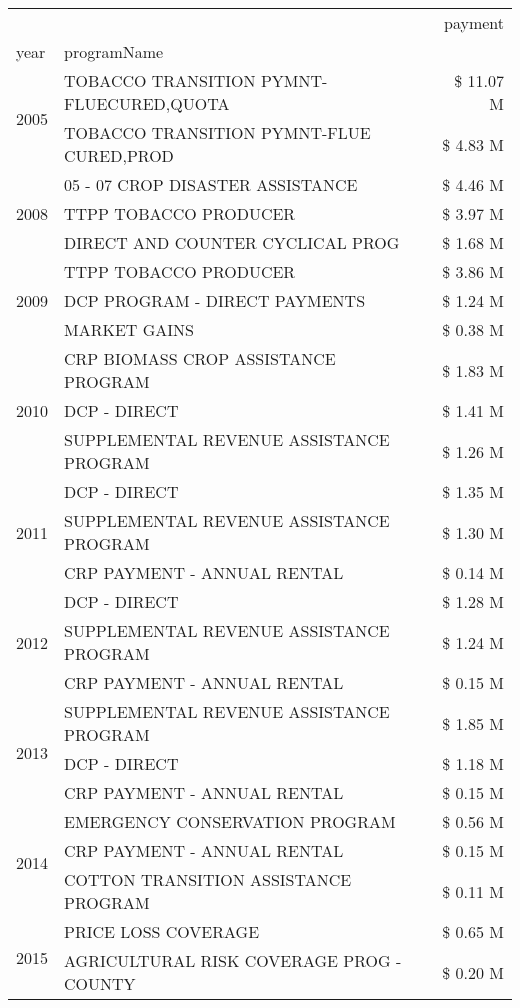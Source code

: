 \begin{tabular}{llr}
\toprule
 &  & payment \\
year & programName &  \\
\midrule
\multirow[t]{2}{*}{2005} & TOBACCO TRANSITION PYMNT-FLUECURED,QUOTA & \$ 11.07 M \\
 & TOBACCO TRANSITION PYMNT-FLUE CURED,PROD & \$ 4.83 M \\
\cline{1-3}
\multirow[t]{3}{*}{2008} & 05 - 07 CROP DISASTER ASSISTANCE & \$ 4.46 M \\
 & TTPP TOBACCO PRODUCER & \$ 3.97 M \\
 & DIRECT AND COUNTER CYCLICAL PROG & \$ 1.68 M \\
\cline{1-3}
\multirow[t]{3}{*}{2009} & TTPP TOBACCO PRODUCER & \$ 3.86 M \\
 & DCP PROGRAM - DIRECT PAYMENTS & \$ 1.24 M \\
 & MARKET GAINS & \$ 0.38 M \\
\cline{1-3}
\multirow[t]{3}{*}{2010} & CRP BIOMASS CROP ASSISTANCE PROGRAM & \$ 1.83 M \\
 & DCP - DIRECT & \$ 1.41 M \\
 & SUPPLEMENTAL REVENUE ASSISTANCE PROGRAM & \$ 1.26 M \\
\cline{1-3}
\multirow[t]{3}{*}{2011} & DCP - DIRECT & \$ 1.35 M \\
 & SUPPLEMENTAL REVENUE ASSISTANCE PROGRAM & \$ 1.30 M \\
 & CRP PAYMENT - ANNUAL RENTAL & \$ 0.14 M \\
\cline{1-3}
\multirow[t]{3}{*}{2012} & DCP - DIRECT & \$ 1.28 M \\
 & SUPPLEMENTAL REVENUE ASSISTANCE PROGRAM & \$ 1.24 M \\
 & CRP PAYMENT - ANNUAL RENTAL & \$ 0.15 M \\
\cline{1-3}
\multirow[t]{3}{*}{2013} & SUPPLEMENTAL REVENUE ASSISTANCE PROGRAM & \$ 1.85 M \\
 & DCP - DIRECT & \$ 1.18 M \\
 & CRP PAYMENT - ANNUAL RENTAL & \$ 0.15 M \\
\cline{1-3}
\multirow[t]{3}{*}{2014} & EMERGENCY CONSERVATION PROGRAM & \$ 0.56 M \\
 & CRP PAYMENT - ANNUAL RENTAL & \$ 0.15 M \\
 & COTTON TRANSITION ASSISTANCE PROGRAM & \$ 0.11 M \\
\cline{1-3}
\multirow[t]{3}{*}{2015} & PRICE LOSS COVERAGE & \$ 0.65 M \\
 & AGRICULTURAL RISK COVERAGE PROG - COUNTY & \$ 0.20 M \\

\end{tabular}
